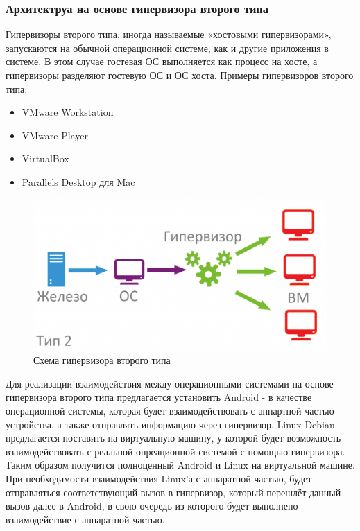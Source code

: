 \documentclass[a4paper, 14pt]{article}
\begin{document}
\clearpage

\subsubsection{Архитектруа на основе гипервизора второго типа}

\par Гипервизоры второго типа, иногда называемые «хостовыми гипервизорами», запускаются на обычной операционной системе, как и другие приложения в системе. В этом случае гостевая ОС выполняется как процесс на хосте, а гипервизоры разделяют гостевую ОС и ОС хоста. Примеры гипервизоров второго типа:
\begin{itemize}
    \item VMware Workstation
    \item VMware Player
    \item VirtualBox
    \item Parallels Desktop для Mac
\end{itemize}

\begin{figure}[h!]
	\centering
	\includegraphics[scale = 0.3]{images/type2.png}
	\caption{Схема гипервизора второго типа}
\end{figure}

\par Для реализации взаимодействия между операционными системами на основе гипервизора второго типа предлагается установить Android - в качестве операционной системы, которая будет взаимодействовать с аппартной частью устройства, а также отправлять информацию через гипервизор. Linux Debian предлагается поставить на виртуальную машину, у которой будет возможность взаимодействовать с реальной опреационной системой с помощью гипервизора. Таким образом получится полноценный Android и Linux на виртуальной машине. При необходимости взаимодействия Linux'а с аппаратной частью, будет отправляться соответствующий вызов в гипервизор, который перешлёт данный вызов далее в Android, в свою очередь из которого будет выполнено взаимодействие с аппаратной частью.  
\end{document}
